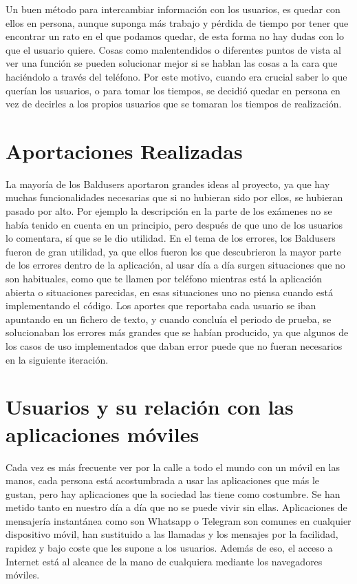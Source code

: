 Un buen método para intercambiar información con los usuarios,  es quedar con ellos en persona, aunque suponga más trabajo y pérdida de tiempo por tener que encontrar un rato en el que podamos quedar, de esta forma no hay dudas con lo que el usuario quiere.
Cosas como malentendidos o diferentes puntos de vista al ver una función se pueden solucionar mejor si se hablan las cosas a la cara que haciéndolo a través del teléfono.
Por este motivo, cuando era crucial saber lo que querían los usuarios, o para tomar los tiempos, se decidió quedar en persona en vez de decirles a los propios usuarios que se tomaran los tiempos de realización.



\section{Aportaciones Realizadas}
\label{secc:aportaciones Realizadas}

La mayoría de los Baldusers aportaron grandes ideas al proyecto, ya que hay muchas funcionalidades necesarias que si no hubieran sido por ellos, se hubieran pasado por alto. Por ejemplo la descripción en la parte de los exámenes no se había tenido en cuenta en un principio, pero después de que uno de los usuarios lo comentara, sí que se le dio utilidad.
En el tema de los errores, los Baldusers fueron de gran utilidad, ya que ellos fueron los que descubrieron la mayor parte de los errores dentro de la aplicación, al usar día a día surgen situaciones que no son habituales, como que te llamen por teléfono mientras está la aplicación abierta o situaciones parecidas, en esas situaciones uno no piensa cuando está implementando el código.
Los aportes que reportaba cada usuario se iban apuntando en un fichero de texto, y cuando concluía el periodo de prueba, se solucionaban los errores más grandes que se habían producido, ya que algunos de los casos de uso implementados que daban error puede que no fueran necesarios en la siguiente iteración.


\section{Usuarios y su relación con las aplicaciones móviles}
\label{secc:usuarios y su relación con las aplicaciones móviles}

Cada vez es más frecuente ver por la calle a todo el mundo con un móvil en las manos, cada persona está acostumbrada a usar las aplicaciones que más le gustan, pero hay aplicaciones que la sociedad las tiene como costumbre. Se han metido tanto en nuestro día a día que no se puede vivir sin ellas. Aplicaciones de mensajería instantánea como son Whatsapp o Telegram son comunes en cualquier dispositivo móvil, han sustituido a las llamadas y los mensajes por la facilidad, rapidez y bajo coste que les supone a los usuarios.
Además de eso, el acceso a Internet está al alcance de la mano de cualquiera mediante los navegadores móviles.

